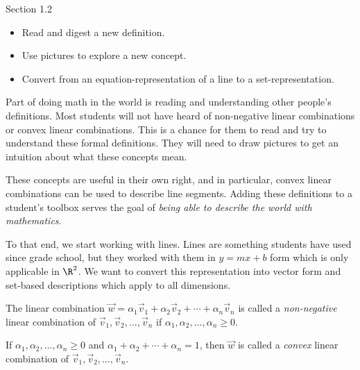 \documentclass{problemset}
\begin{document}
\begin{lesson}
	\newpage {}

	 Section 1.2

	\begin{itemize}
		\item Read and digest a new definition.

		\item Use pictures to explore a new concept.

		\item Convert from an equation-representation of a line to a set-representation.
	\end{itemize}

	 Part of doing math in the world is reading and understanding
	other people's definitions. Most students will not have heard of non-negative
	linear combinations or convex linear combinations. This is a chance for them
	to read and try to understand these formal definitions. They will need to
	draw pictures to get an intuition about what these concepts mean.

	These concepts are useful in their own right, and in particular, convex linear
	combinations can be used to describe line segments. Adding these definitions
	to a student's toolbox serves the goal of \emph{being able to describe
	the world with mathematics}.

	To that end, we start working with lines. Lines are something students have
	used since grade school, but they worked with them in $y=mx+b$ form which
	is only applicable in $\R^{2}$. We want to convert this representation
	into vector form and set-based descriptions which apply to all
	dimensions.

	\newpage
\end{lesson}
	\begin{definition}
		The linear combination $\vec w=\alpha_1\vec v_1+\alpha_2\vec v_2+\cdots+\alpha_n\vec v_n$ is
		called a \emph{non-negative} linear combination of $\vec v_1,\vec v_2,\ldots,\vec v_n$ if
		$\alpha_1,\alpha_2,\ldots,\alpha_n\geq 0$. 
		
		If $\alpha_1,\alpha_2,\ldots,\alpha_n\geq 0$
		and $\alpha_1+\alpha_2+\cdots+\alpha_n=1$, then $\vec w$ is called a \emph{convex} linear combination
		of  $\vec v_1,\vec v_2,\ldots,\vec v_n$.
	\end{definition}
\end{document}
